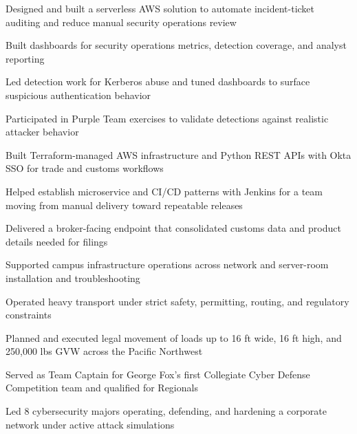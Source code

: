 \documentclass[10pt]{article}
\begin{document}
\begin{entryitems}
  \item Designed and built a serverless AWS solution to automate incident-ticket auditing and reduce manual security operations review
  \item Built dashboards for security operations metrics, detection coverage, and analyst reporting
  \item Led detection work for Kerberos abuse and tuned dashboards to surface suspicious authentication behavior
  \item Participated in Purple Team exercises to validate detections against realistic attacker behavior
\end{entryitems}

\begin{entryitems}
  \item Built Terraform-managed AWS infrastructure and Python REST APIs with Okta SSO for trade and customs workflows
  \item Helped establish microservice and CI/CD patterns with Jenkins for a team moving from manual delivery toward repeatable releases
  \item Delivered a broker-facing endpoint that consolidated customs data and product details needed for filings
\end{entryitems}

\newpage
{}
\begin{entryitems}
  \item Supported campus infrastructure operations across network and server-room installation and troubleshooting
\end{entryitems}

\begin{entryitems}
  \item Operated heavy transport under strict safety, permitting, routing, and regulatory constraints
  \item Planned and executed legal movement of loads up to 16 ft wide, 16 ft high, and 250,000 lbs GVW across the Pacific Northwest
\end{entryitems}

\begin{entryitems}
  \item Served as Team Captain for George Fox's first Collegiate Cyber Defense Competition team and qualified for Regionals
  \item Led 8 cybersecurity majors operating, defending, and hardening a corporate network under active attack simulations
\end{entryitems}
\end{document}

